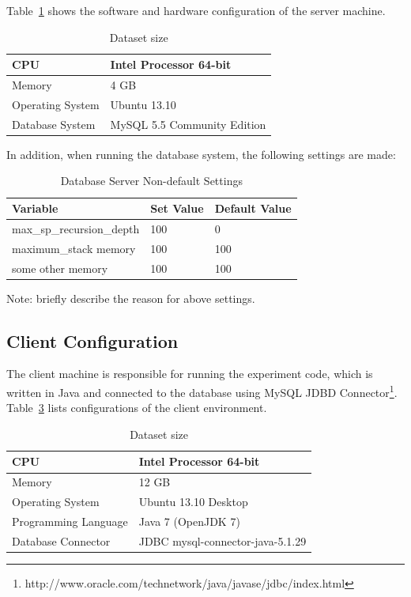 Table~\ref{table:tbl_server_config} shows the software and hardware configuration of the server machine.

\begin{table}[h]
\centering
\begin{tabular}{|l|l|}
\hline
CPU & Intel Processor 64-bit \\ \hline
Memory & 4 GB \\ \hline
Operating System & Ubuntu 13.10 \\ \hline
Database System & MySQL 5.5 Community Edition \\ \hline 
\end{tabular}
\caption{Dataset size\label{table:tbl_server_config}}
\end{table}

In addition, when running the database system, the following settings are made:

\begin{table}[h]
\centering
\begin{tabular}{|l|l|l|}
\hline
Variable & Set Value & Default Value \\ \hline
max\_sp\_recursion\_depth & 100 & 0 \\ \hline
maximum\_stack memory & 100 & 100 \\ \hline
some other memory & 100 & 100 \\ \hline
\end{tabular}
\caption{Database Server Non-default Settings\label{table:tbl_server_settings}}
\end{table}

Note: briefly describe the reason for above settings.

\subsection{Client Configuration}\label{sec-client-config}

The client machine is responsible for running the experiment code, which is written in Java and connected to the database using MySQL JDBD Connector\footnote{http://www.oracle.com/technetwork/java/javase/jdbc/index.html}. Table~\ref{tbl-client-config} lists configurations of the client environment.

\begin{table}[h]
\centering
\begin{tabular}{|l|l|}
\hline
CPU & Intel Processor 64-bit \\ \hline
Memory & 12 GB \\ \hline
Operating System & Ubuntu 13.10 Desktop \\ \hline
Programming Language & Java 7 (OpenJDK 7) \\ \hline
Database Connector   & JDBC mysql-connector-java-5.1.29 \\ \hline
\end{tabular}
\caption{Dataset size\label{tbl-client-config}}
\end{table}

